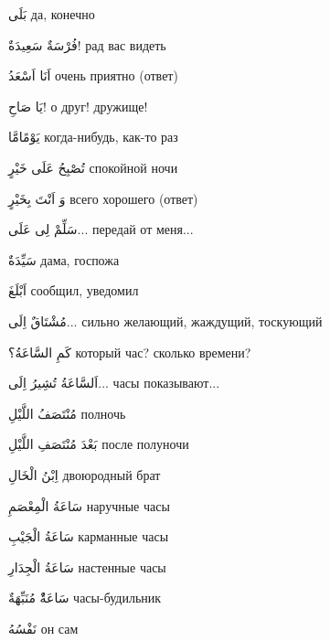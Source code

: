 \documentclass[a5paper]{article}
\newcommand\textstyleDropCaps[1]{#1}
\newcommand\textstyleCaptioncharacters[1]{#1}
\begin{document}
\textstyleCaptioncharacters{بَلَى }\textstyleDropCaps{да, конечно‎}

\textstyleCaptioncharacters{فُرْسَةٌ سَعِيدَةٌ!ِ }\textstyleDropCaps{рад вас видеть‎}

\textstyleCaptioncharacters{اَنَا اَسْعَدُ }\textstyleDropCaps{очень приятно (ответ)‎}

\textstyleCaptioncharacters{يَا صَاحِ!ِ }\textstyleDropCaps{о друг! дружи­ще!‎}

\textstyleCaptioncharacters{يَوْمًامَّا }\textstyleDropCaps{когда-нибудь, как-то раз‎}

\textstyleCaptioncharacters{تُصْبِحُ عَلَى خَيْرٍ }\textstyleDropCaps{спо­койной ночи‎}

\textstyleCaptioncharacters{وَ اَنْتَ بِخَيْرٍ }\textstyleDropCaps{всего хоро­шего (ответ)‎}

\textstyleCaptioncharacters{سَلِّمْ لِى عَلَى...ِ }\textstyleDropCaps{пере­дай от меня...‎}

\textstyleCaptioncharacters{سَيِّدَةٌ }\textstyleDropCaps{дама, госпожа‎}

\textstyleCaptioncharacters{اَبْلَغَ }\textstyleDropCaps{сообщил, уведомил‎}

\textstyleCaptioncharacters{مُشْتَاقٌ اِلَى...ِ }\textstyleDropCaps{сильно же­лающий, жаждущий, тоскующий‎}

\textstyleCaptioncharacters{كَمِ السَّاعَةُ؟ }\textstyleDropCaps{который час? сколько времени?‎}

\textstyleCaptioncharacters{اَلسَّاعَةُ تُشِيرُ اِلَى... }\textstyleDropCaps{часы показывают...‎}

\textstyleCaptioncharacters{مُنْتَصَفُ اللَّيْلِ }\textstyleDropCaps{полночь‎}

\textstyleCaptioncharacters{بَعْدَ مُنْتَصَفِ اللَّيْلِ }\textstyleDropCaps{по­сле полуночи‎}

\textstyleCaptioncharacters{اِبْنُ الْخَالِ }\textstyleDropCaps{двоюродный брат‎}

\textstyleCaptioncharacters{سَاعَةُ الْمِعْصَمِ }\textstyleDropCaps{наруч­ные часы‎}

\textstyleCaptioncharacters{سَاعَةُ الْجَيْبِ }\textstyleDropCaps{карман­ные часы‎}

\textstyleCaptioncharacters{سَاعَةُ الْجِدَارِ }\textstyleDropCaps{настен­ные часы‎}

\textstyleCaptioncharacters{سَاعَةٌْ مُنَبِّهَةٌ }\textstyleDropCaps{часы-будильник‎}

\textstyleCaptioncharacters{نَفْسُهُ }\textstyleDropCaps{он сам‎}
\end{document}

